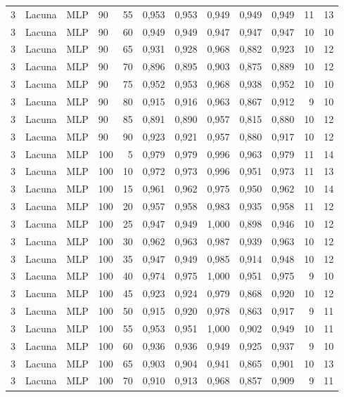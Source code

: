 \begin{longtable}{ccclrrrrrrrr}
3 & Lacuna & MLP & 90 & 55 & 0,953 & 0,953 & 0,949 & 0,949 & 0,949 & 11 & 13 \\
3 & Lacuna & MLP & 90 & 60 & 0,949 & 0,949 & 0,947 & 0,947 & 0,947 & 10 & 10 \\
3 & Lacuna & MLP & 90 & 65 & 0,931 & 0,928 & 0,968 & 0,882 & 0,923 & 10 & 12 \\
3 & Lacuna & MLP & 90 & 70 & 0,896 & 0,895 & 0,903 & 0,875 & 0,889 & 10 & 12 \\
3 & Lacuna & MLP & 90 & 75 & 0,952 & 0,953 & 0,968 & 0,938 & 0,952 & 10 & 10 \\
3 & Lacuna & MLP & 90 & 80 & 0,915 & 0,916 & 0,963 & 0,867 & 0,912 & 9 & 10 \\
3 & Lacuna & MLP & 90 & 85 & 0,891 & 0,890 & 0,957 & 0,815 & 0,880 & 10 & 12 \\
3 & Lacuna & MLP & 90 & 90 & 0,923 & 0,921 & 0,957 & 0,880 & 0,917 & 10 & 12 \\
3 & Lacuna & MLP & 100 & 5 & 0,979 & 0,979 & 0,996 & 0,963 & 0,979 & 11 & 14 \\
3 & Lacuna & MLP & 100 & 10 & 0,972 & 0,973 & 0,996 & 0,951 & 0,973 & 11 & 13 \\
3 & Lacuna & MLP & 100 & 15 & 0,961 & 0,962 & 0,975 & 0,950 & 0,962 & 10 & 14 \\
3 & Lacuna & MLP & 100 & 20 & 0,957 & 0,958 & 0,983 & 0,935 & 0,958 & 11 & 12 \\
3 & Lacuna & MLP & 100 & 25 & 0,947 & 0,949 & 1,000 & 0,898 & 0,946 & 10 & 12 \\
3 & Lacuna & MLP & 100 & 30 & 0,962 & 0,963 & 0,987 & 0,939 & 0,963 & 10 & 12 \\
3 & Lacuna & MLP & 100 & 35 & 0,947 & 0,949 & 0,985 & 0,914 & 0,948 & 10 & 12 \\
3 & Lacuna & MLP & 100 & 40 & 0,974 & 0,975 & 1,000 & 0,951 & 0,975 & 9 & 10 \\
3 & Lacuna & MLP & 100 & 45 & 0,923 & 0,924 & 0,979 & 0,868 & 0,920 & 10 & 12 \\
3 & Lacuna & MLP & 100 & 50 & 0,915 & 0,920 & 0,978 & 0,863 & 0,917 & 9 & 11 \\
3 & Lacuna & MLP & 100 & 55 & 0,953 & 0,951 & 1,000 & 0,902 & 0,949 & 10 & 11 \\
3 & Lacuna & MLP & 100 & 60 & 0,936 & 0,936 & 0,949 & 0,925 & 0,937 & 9 & 10 \\
3 & Lacuna & MLP & 100 & 65 & 0,903 & 0,904 & 0,941 & 0,865 & 0,901 & 10 & 13 \\
3 & Lacuna & MLP & 100 & 70 & 0,910 & 0,913 & 0,968 & 0,857 & 0,909 & 9 & 11 \\

\end{longtable}
